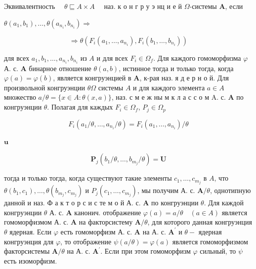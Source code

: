 \documentclass[10pt]{article}
\begin{document}
Эквивалентность $\quad \theta \sqsubseteq A \times A \quad$ наз. к о н г р у э нц и е й $\Omega$-системы $\boldsymbol{A}$, если



$\theta\left(a_{1}, b_{1}\right), \ldots, \theta\left(a_{n_{i}}, b_{n_{i}}\right) \Rightarrow$



\[

\Rightarrow \theta\left(F_{i}\left(a_{1}, \ldots, a_{n_{i}}\right), F_{i}\left(b_{1}, \ldots, b_{n_{i}}\right)\right)

\]



для всех $a_{1}, b_{1}, \ldots, a_{n_{i}}, b_{n_{i}}$ из $A$ и для всех $F_{i} \in \Omega_{f}$. Для каждого гомоморфизма $\varphi$ А. с. $\boldsymbol{A}$ бинарное отношение $\theta(a, b)$, истинное тогда и только тогда, когда $\varphi(a)=\varphi(b)$, является конгруэнцией в $\boldsymbol{A}$, к-рая наз. я д е р н о й. Для произвольной конгруэнции $\theta \Omega$ системы $A$ и для каждого элемента $a \in A$ множество $a / \theta=\{x \in A: \theta(x, a)\}$, наз. с м е ж ны м к л а с с о м A. с. $\boldsymbol{A}$ по конгруэнции $\theta$. Полагая для каждых $F_{i} \in \Omega_{f}$, $P_{j} \in \Omega_{p}$



\[

F_{i}\left(a_{1} / \theta, \ldots, a_{n_{i}} / \theta\right)=F_{i}\left(a_{1}, \ldots, a_{n_{i}}\right) / \theta

\]



$\mathbf{u}$



\[

\boldsymbol{P}_{j}\left(b_{1} / \theta, \ldots, b_{m_{j}} / \theta\right)=\boldsymbol{U}

\]



тогда и только тогда, когда существуют такие элементы $c_{1}, \ldots, c_{m_{j}}$ в $A$, что $\theta\left(b_{1}, c_{1}\right), \ldots, \theta\left(b_{m_{j}}, c_{m_{j}}\right)$ и $P_{j}\left(c_{1}, \ldots, c_{m_{j}}\right)$, мы получим А. с. $\boldsymbol{A} / \theta$, однотипную данной и наз. Ф а к т о р с и с те м о й А. с. $\boldsymbol{A}$ по конгруэнции $\theta$. Для каждой конгруэнции $\theta$ А. с. $\boldsymbol{A}$ канонич. отображение $\varphi(a)=a / \theta \quad(a \in A)$ является гомоморфизмом А. с. $\boldsymbol{A}$ на факторсистему $\boldsymbol{A} / \theta$, для которого данная конгруэнция $\theta$ ядерная. Если $\varphi$ есть гомоморфизм А. с. $\boldsymbol{A}$ на А. с. $\boldsymbol{A}^{\prime}$ и $\theta-$ ядерная конгруэнция для $\varphi$, то отображение $\psi(a / \theta)=\varphi(a)$ является гомоморфизмом факторсистемы $\boldsymbol{A} / \theta$ на А. с. $\boldsymbol{A}^{\prime}$. Если при этом гомоморфизм $\varphi$ сильный, то $\psi$ есть изоморфизм.
\end{document}
